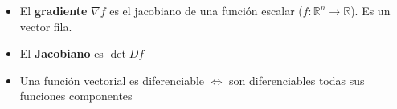 \documentclass[a4paper,twocolumn]{extarticle}
\newcommand{\R}{\mathbb{R}}
\begin{document}
\begin{itemize}
\begin{enumerate}
\begin{align*}
\begin{array}{c}
			Df_1(x_0) \\\hline
			\vdots \\\hline
			Df_m(x_0) 
			\end{array}\right) \\
			Df_{x_0} &:= \left(\begin{array}{ccc}
			\partial_{x_1}f_1(x_0) & \dots & \partial_{x_n}f_1(x_0) \\
			\vdots & \ddots & \vdots \\
			\partial_{x_1}f_m(x_0) & \dots & \partial_{x_n}f_m(x_0) \\
			\end{array}\right)
		\end{align*}
		\item $Df_{x_0}$ cumple la definición de diferenciabilidad
	\end{enumerate}
	\item El \textbf{gradiente} $\nabla f$ es el jacobiano de una función escalar ($f: \R^n \to \R$). Es un vector fila.
	\item El \textbf{Jacobiano} es $\det Df$
	\item Una función vectorial es diferenciable $\iff$ son diferenciables todas sus funciones componentes
\end{itemize}
\end{document}
